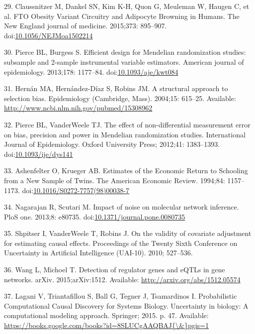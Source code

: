 \documentclass[]{article}
\begin{document}
\hypertarget{ref-Claussnitzer2015}{}
29. Claussnitzer M, Dankel SN, Kim K-H, Quon G, Meuleman W, Haugen C, et
al. FTO Obesity Variant Circuitry and Adipocyte Browning in Humans. The
New England journal of medicine. 2015;373: 895--907.
doi:\href{https://doi.org/10.1056/NEJMoa1502214}{10.1056/NEJMoa1502214}

\hypertarget{ref-Pierce2013}{}
30. Pierce BL, Burgess S. Efficient design for Mendelian randomization
studies: subsample and 2-sample instrumental variable estimators.
American journal of epidemiology. 2013;178: 1177--84.
doi:\href{https://doi.org/10.1093/aje/kwt084}{10.1093/aje/kwt084}

\hypertarget{ref-Hernan2004}{}
31. Hernán MA, Hernández-Díaz S, Robins JM. A structural approach to
selection bias. Epidemiology (Cambridge, Mass). 2004;15: 615--25.
Available: \url{http://www.ncbi.nlm.nih.gov/pubmed/15308962}

\hypertarget{ref-Pierce2012}{}
32. Pierce BL, VanderWeele TJ. The effect of non-differential
measurement error on bias, precision and power in Mendelian
randomization studies. International Journal of Epidemiology. Oxford
University Press; 2012;41: 1383--1393.
doi:\href{https://doi.org/10.1093/ije/dys141}{10.1093/ije/dys141}

\hypertarget{ref-Ashenfelter1994}{}
33. Ashenfelter O, Krueger AB. Estimates of the Economic Return to
Schooling from a New Sample of Twins. The American Economic Review.
1994;84: 1157--1173.
doi:\href{https://doi.org/10.1016/S0272-7757(98)00038-7}{10.1016/S0272-7757(98)00038-7}

\hypertarget{ref-Nagarajan2013}{}
34. Nagarajan R, Scutari M. Impact of noise on molecular network
inference. PloS one. 2013;8: e80735.
doi:\href{https://doi.org/10.1371/journal.pone.0080735}{10.1371/journal.pone.0080735}

\hypertarget{ref-Shpitser2010}{}
35. Shpitser I, VanderWeele T, Robins J. On the validity of covariate
adjustment for estimating causal effects. Proceedings of the Twenty
Sixth Conference on Uncertainty in Artificial Intelligence (UAI-10).
2010; 527--536.

\hypertarget{ref-Wang2015}{}
36. Wang L, Michoel T. Detection of regulator genes and eQTLs in gene
networks. arXiv. 2015;arXiv:1512. Available:
\url{http://arxiv.org/abs/1512.05574}

\hypertarget{ref-Lagani2015}{}
37. Lagani V, Triantafillou S, Ball G, Tegner J, Tsamardinos I.
Probabilistic Computational Causal Discovery for Systems Biology.
Uncertainty in biology: A computational modeling approach. Springer;
2015. p. 47. Available:
\href{https://books.google.com/books?id=8SLUCgAAQBAJ\%7B/\&\%7Dpgis=1}{https://books.google.com/books?id=8SLUCgAAQBAJ\{\textbackslash{}\&\}pgis=1}
\end{document}
